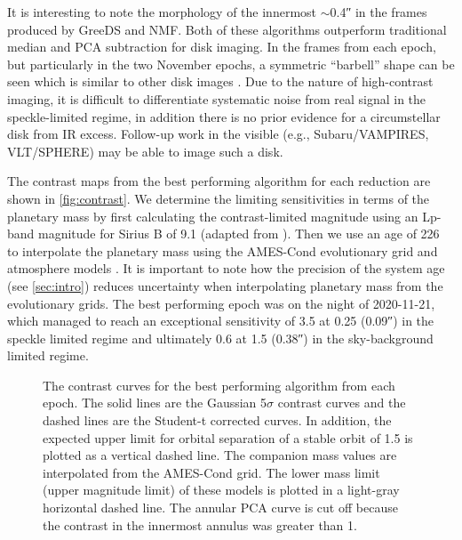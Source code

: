 \documentclass[twocolumn]{aastex631}
\begin{document}
It is interesting to note the morphology of the innermost $\sim$\ang{;;0.4} in the frames produced by GreeDS and NMF. Both of these algorithms outperform traditional median and PCA subtraction for disk imaging. In the frames from each epoch, but particularly in the two November epochs, a symmetric ``barbell'' shape can be seen which is similar to other disk images \citep[e.g., fig.~7][]{norris_vampires_2014}. Due to the nature of high-contrast imaging, it is difficult to differentiate systematic noise from real signal in the speckle-limited regime, in addition there is no prior evidence for a circumstellar disk from IR excess. Follow-up work in the visible (e.g., Subaru/VAMPIRES, VLT/SPHERE) may be able to image such a disk.

The contrast maps from the best performing algorithm for each reduction are shown in \autoref{fig:contrast}. We determine the limiting sensitivities in terms of the planetary mass by first calculating the contrast-limited magnitude using an Lp-band magnitude for Sirius B of 9.1 (adapted from \citealp{bonnet-bidaud_adonis_2008}). Then we use an age of \qty{226}{\mega\year} to interpolate the planetary mass using the AMES-Cond evolutionary grid and atmosphere models \citep{allard_models_2012}. It is important to note how the precision of the system age (see \autoref{sec:intro}) reduces uncertainty when interpolating planetary mass from the evolutionary grids. The best performing epoch was on the night of 2020-11-21, which managed to reach an exceptional sensitivity of \qty{3.5}{\jupitermass} at \qty{0.25}{\au} (\ang{;;0.09}) in the speckle limited regime and ultimately \qty{0.6}{\jupitermass} at \qty{1.5}{\au} (\ang{;;0.38}) in the sky-background limited regime.


\begin{figure*}
    \centering
    \caption{The contrast curves for the best performing algorithm from each epoch. The solid lines are the Gaussian 5$\sigma$ contrast curves and the dashed lines are the Student-t corrected curves. In addition, the expected upper limit for orbital separation of a stable orbit of \qty{1.5}{\au} is plotted as a vertical dashed line. The companion mass values are interpolated from the AMES-Cond grid. The lower mass limit (upper magnitude limit) of these models is plotted in a light-gray horizontal dashed line. The annular PCA curve is cut off because the contrast in the innermost annulus was greater than 1.}
    \label{fig:contrast}
\end{figure*}
\end{document}
